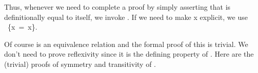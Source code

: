 Thus, whenever we need to complete a proof by simply asserting that is definitionally equal to itself, we invoke . If we need to make \ab x explicit, we use ~\{\ab x~=~\ab x\}.

Of course  is an equivalence relation and the formal proof of this is trivial. We don't need to prove reflexivity since it is the defining property of .  Here are the (trivial) proofs of symmetry and transitivity of .%
\ccpad
